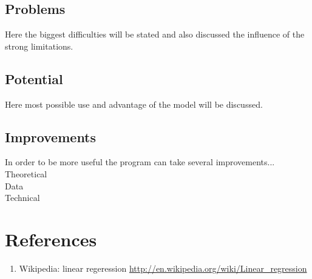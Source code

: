 \documentclass[12pt, a4paper]{article}
\begin{document}
\subsection{Problems}
Here the biggest difficulties will be stated and also discussed the influence of the strong limitations.
\subsection{Potential}
Here most possible use and advantage of the model will be discussed.
\subsection{Improvements}
In order to be more useful the program can take several improvements...\\
Theoretical\\
Data\\
Technical

\newpage
\section{References}
\begin{enumerate}
	\item Wikipedia: linear regeression \url{http://en.wikipedia.org/wiki/Linear_regression}
\end{enumerate}
\end{document}

